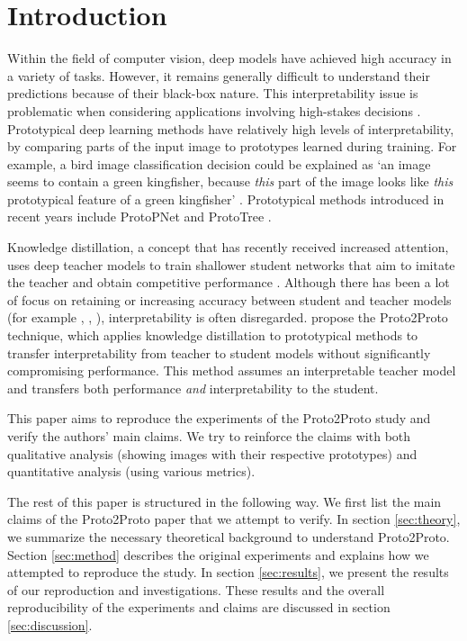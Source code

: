 \section{Introduction}

Within the field of computer vision, deep models have achieved high accuracy in a variety of tasks. However, it remains generally difficult to understand their predictions because of their black-box nature. This interpretability issue is problematic when considering applications involving high-stakes decisions \citep{li2022interpretable}. Prototypical deep learning methods have relatively high levels of interpretability, by comparing parts of the input image to prototypes learned during training. For example, a bird image classification decision could be explained as `an image seems to contain a green kingfisher, because \emph{this} part of the image looks like \emph{this} prototypical feature of a green kingfisher' \citep{donnelly2022deformable}. Prototypical methods introduced in recent years include ProtoPNet \citep{chen2019this} and ProtoTree \citep{nauta2021neural}. \par

Knowledge distillation, a concept that has recently received increased attention, uses deep teacher models to train shallower student networks that aim to imitate the teacher and obtain competitive performance \citep{gou2021knowledge}. Although there has been a lot of focus on retaining or increasing accuracy between student and teacher models (for example \cite{hinton2015distilling}, \cite{hong2020distilling}, \cite{hong2021student}), interpretability is often disregarded. \citet{keswani2022proto2proto} propose the Proto2Proto technique, which applies knowledge distillation to prototypical methods to transfer interpretability from teacher to student models without significantly compromising performance. This method assumes an interpretable teacher model and transfers both performance \emph{and} interpretability to the student.

\par
This paper aims to reproduce the experiments of the Proto2Proto study and verify the authors' main claims. We try to reinforce the claims with both qualitative analysis (showing images with their respective prototypes) and quantitative analysis (using various metrics).

The rest of this paper is structured in the following way. We first list the main claims of the Proto2Proto paper that we attempt to verify. In section \ref{sec:theory}, we summarize the necessary theoretical background to understand Proto2Proto. Section \ref{sec:method} describes the original experiments and explains how we attempted to reproduce the study. In section \ref{sec:results}, we present the results of our reproduction and investigations. These results and the overall reproducibility of the experiments and claims are discussed in section \ref{sec:discussion}.


